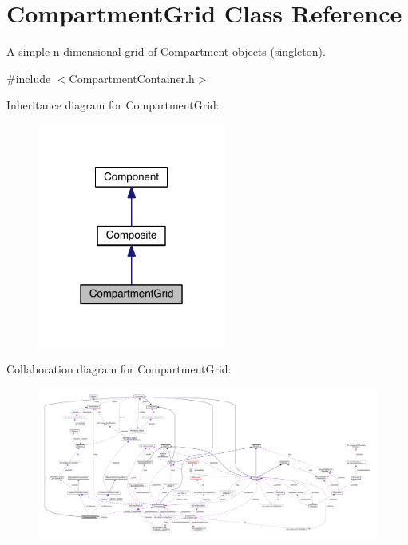 \hypertarget{classCompartmentGrid}{\section{Compartment\+Grid Class Reference}
\label{classCompartmentGrid}
}


A simple n-\/dimensional grid of \hyperlink{classCompartment}{Compartment} objects (singleton).  




{\ttfamily \#include $<$Compartment\+Container.\+h$>$}



Inheritance diagram for Compartment\+Grid\+:\nopagebreak
\begin{figure}[H]
\begin{center}
\leavevmode
\includegraphics[width=175pt]{classCompartmentGrid__inherit__graph}
\end{center}
\end{figure}


Collaboration diagram for Compartment\+Grid\+:\nopagebreak
\begin{figure}[H]
\begin{center}
\leavevmode
\includegraphics[width=350pt]{classCompartmentGrid__coll__graph}
\end{center}
\end{figure}
